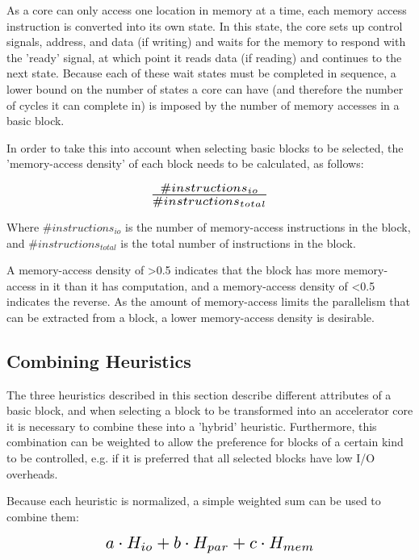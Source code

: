 \documentclass{UoYCSproject}
\begin{document}
As a core can only access one location in memory at a time, each memory access instruction is converted into its own state.
In this state, the core sets up control signals, address, and data (if writing) and waits for the memory to respond
with the 'ready' signal, at which point it reads data (if reading) and continues to the next state. Because each of these
wait states must be completed in sequence, a lower bound on the number of states a core can have (and therefore the number
of cycles it can complete in) is imposed by the number of memory accesses in a basic block.

In order to take this into account when selecting basic blocks to be selected, the 'memory-access density' of each block needs
to be calculated, as follows:

\begin{equation}
\scalebox{1.5}{$\frac{\#instructions_{io}}{\#instructions_{total}}$}
\end{equation}

Where \(\#instructions_{io}\) is the number of memory-access instructions in the block, and \(\#instructions_{total}\) is the
total number of instructions in the block.

A memory-access density of >0.5 indicates that the block has more memory-access in it than it has computation, and a memory-access
density of <0.5 indicates the reverse. As the amount of memory-access limits the parallelism that can be extracted from a block,
a lower memory-access density is desirable.

\subsection{Combining Heuristics}

The three heuristics described in this section describe different attributes of a basic block, and when selecting a block
to be transformed into an accelerator core it is necessary to combine these into a 'hybrid' heuristic. Furthermore,
this combination can be weighted to allow the preference for blocks of a certain kind to be controlled, e.g. if it is preferred
that all selected blocks have low I/O overheads.

Because each heuristic is normalized, a simple weighted sum can be used to combine them:

\begin{equation}
\scalebox{1.5}{$a \cdot H_{io} + b \cdot H_{par} + c \cdot H_{mem}$}
\end{equation}
\end{document}
